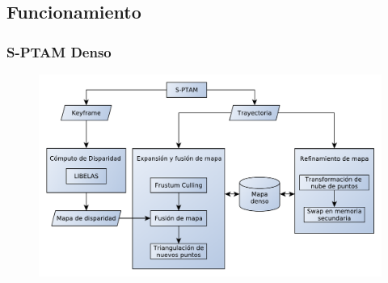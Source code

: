 \documentclass[compress]{beamer}
\begin{document}
\subsection{Funcionamiento}


\begin{frame}
	\frametitle{S-PTAM Denso}
	
	\begin{figure}[htb]
		\centering
		\includegraphics[width=1.0\columnwidth]{./method/metodo-diagram.pdf}
		\hfill
	\end{figure}
\end{frame}
\end{document}
